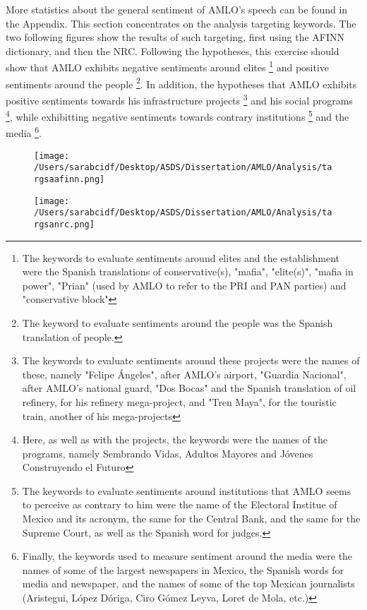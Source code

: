 \documentclass[]{article}
\begin{document}
More statistics about the general sentiment of AMLO's speech can be found in the Appendix. This section concentrates on the analysis targeting keywords. The two following figures show the results of such targeting, first using the AFINN dictionary, and then the NRC. Following the hypotheses, this exercise should show that AMLO exhibits negative sentiments around elites
\footnote{The keywords to evaluate sentiments around elites and the establishment were the Spanish translations of conservative(s), "mafia", "elite(s)", "mafia in power", "Prian" (used by AMLO to refer to the PRI and PAN parties) and "conservative block"} 
and positive sentiments around the people
\footnote{The keyword to evaluate sentiments around the people was the Spanish translation of people.}. 
In addition, the hypotheses that AMLO exhibits positive sentiments towards his infrastructure projects
\footnote{The keywords to evaluate sentiments around these projects were the names of these, namely "Felipe Ángeles", after AMLO's airport, "Guardia Nacional", after AMLO's national guard, "Dos Bocas" and the Spanish translation of oil refinery, for his refinery mega-project, and "Tren Maya", for the touristic train, another of his mega-projects} 
and his social programs
\footnote{Here, as well as with the projects, the keywords were the names of the programs, namely Sembrando Vidas, Adultos Mayores and Jóvenes Construyendo el Futuro}, 
while exhibitting negative sentiments towards contrary institutions
\footnote{The keywords to evaluate sentiments around institutions that AMLO seems to perceive as contrary to him were the name of the Electoral Institue of Mexico and its acronym, the same for the Central Bank, and the same for the Supreme Court, as well as the Spanish word for judges.} 
and the media
\footnote{Finally, the keywords used to measure sentiment around the media were the names of some of the largest newspapers in Mexico, the Spanish words for media and newspaper, and the names of some of the top Mexican journalists (Aristegui, López Dóriga, Ciro Gómez Leyva, Loret de Mola, etc.)}. 

\begin{figure}[H]
	\centering
	\caption{\label{}}
	\texttt{[image: /Users/sarabcidf/Desktop/ASDS/Dissertation/AMLO/Analysis/targsaafinn.png]}
\end{figure}

\begin{figure}[H]
	\centering
	\caption{\label{}}
	\texttt{[image: /Users/sarabcidf/Desktop/ASDS/Dissertation/AMLO/Analysis/targsanrc.png]}
\end{figure}
\end{document}
